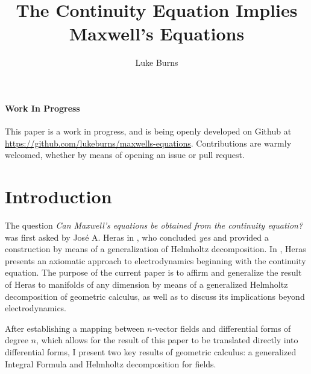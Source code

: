 \documentclass{article}
\title{The Continuity Equation Implies Maxwell's Equations}
\author{Luke Burns}
\begin{document}
\maketitle
{}

\paragraph{Work In Progress} This paper is a work in progress, and is being openly developed on Github at \url{https://github.com/lukeburns/maxwells-equations}. Contributions are warmly welcomed, whether by means of opening an issue or pull request.

\section{Introduction}

The question \emph{Can Maxwell’s equations be obtained from
the continuity equation?} was first asked by Jos\'e A. Heras in \cite{heras}, who concluded \emph{yes} and provided a construction by means of a generalization of Helmholtz decomposition. In \cite{heras-axiomatic}, Heras presents an axiomatic approach to electrodynamics beginning with the continuity equation. The purpose of the current paper is to affirm and generalize the result of Heras to manifolds of any dimension by means of a generalized Helmholtz decomposition of geometric calculus, as well as to discuss its implications beyond electrodynamics.

After establishing a mapping between $n$-vector fields and differential forms of degree $n$, which allows for the result of this paper to be translated directly into differential forms, I present two key results of geometric calculus: a generalized Integral Formula and Helmholtz decomposition for fields. 
\end{document}
